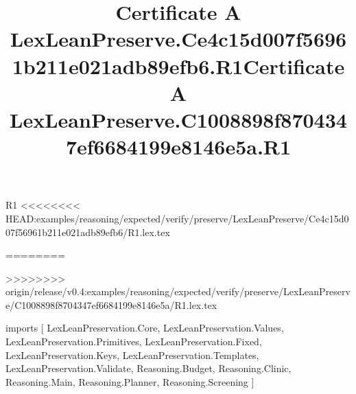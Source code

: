 \begin{lexlean}{R1}
<<<<<<<< HEAD:examples/reasoning/expected/verify/preserve/LexLeanPreserve/Ce4c15d007f56961b211e021adb89efb6/R1.lex.tex
\title{Certificate A LexLeanPreserve.Ce4c15d007f56961b211e021adb89efb6.R1}
========
\title{Certificate A LexLeanPreserve.C1008898f8704347ef6684199e8146e5a.R1}
>>>>>>>> origin/release/v0.4:examples/reasoning/expected/verify/preserve/LexLeanPreserve/C1008898f8704347ef6684199e8146e5a/R1.lex.tex
\begin{coremodule}
imports [
  LexLeanPreservation.Core,
  LexLeanPreservation.Values,
  LexLeanPreservation.Primitives,
  LexLeanPreservation.Fixed,
  LexLeanPreservation.Keys,
  LexLeanPreservation.Templates,
  LexLeanPreservation.Validate,
  Reasoning.Budget,
  Reasoning.Clinic,
  Reasoning.Main,
  Reasoning.Planner,
  Reasoning.Screening
]


\end{coremodule}
\end{lexlean}
